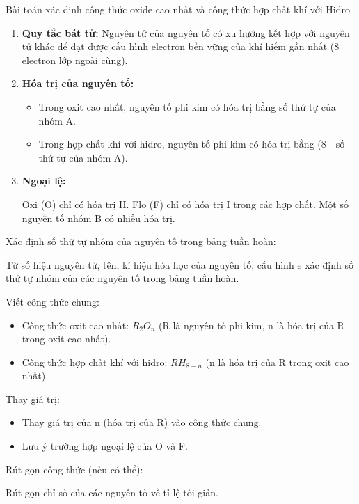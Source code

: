 \begin{dang}{Bài toán xác định công thức oxide cao nhất và công thức hợp chất khí với Hidro}
\end{dang}
\begin{pp}
		\begin{enumerate}
			\item  \textbf{Quy tắc bát tử:} Nguyên tử của nguyên tố có xu hướng kết hợp với nguyên tử khác để đạt được cấu hình electron bền vững của khí hiếm gần nhất (8 electron lớp ngoài cùng).
			\item  \textbf{Hóa trị của nguyên tố:}
			\begin{itemize}
				\item  Trong oxit cao nhất, nguyên tố phi kim có hóa trị bằng số thứ tự của nhóm A.
				\item  Trong hợp chất khí với hidro, nguyên tố phi kim có hóa trị bằng (8 - số thứ tự của nhóm A).
			\end{itemize}
			\item  \textbf{Ngoại lệ:}
			
			Oxi (O) chỉ có hóa trị II.
			Flo (F) chỉ có hóa trị I trong các hợp chất.
			Một số nguyên tố nhóm B có nhiều hóa trị.
		\end{enumerate}
		\begin{cacbuoc}
			\item Xác định số thứ tự nhóm của nguyên tố trong bảng tuần hoàn:

			Từ số hiệu nguyên tử, tên, kí hiệu hóa học của nguyên tố, cấu hình e xác định số thứ tự nhóm của các nguyên tố trong bảng tuần hoàn.
			\item  Viết công thức chung:
			\begin{itemize}
				\item  Công thức oxit cao nhất: $R_2O_n$ (R là nguyên tố phi kim, n là hóa trị của R trong oxit cao nhất).
				\item  Công thức hợp chất khí với hidro: $RH_{8-n}$ (n là hóa trị của R trong oxit cao nhất).
			\end{itemize}
			\item  Thay giá trị:
			\begin{itemize}
				\item  Thay giá trị của n (hóa trị của R) vào công thức chung.
				\item  Lưu ý trường hợp ngoại lệ của O và F.
			\end{itemize}
			\item  Rút gọn công thức (nếu có thể):
			
			Rút gọn chỉ số của các nguyên tố về tỉ lệ tối giản.
		\end{cacbuoc}
\end{pp}
